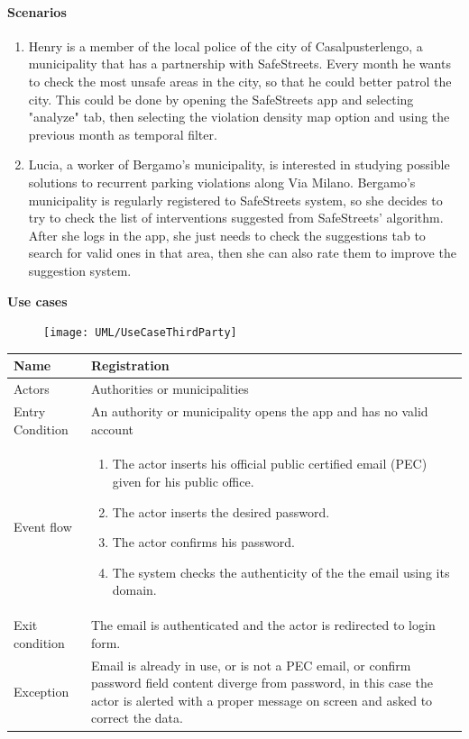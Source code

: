 \paragraph{Scenarios}
\begin{enumerate}
    \item Henry is a member of the local police of the city of Casalpusterlengo, a municipality that has a partnership with SafeStreets. Every month he wants to check the most unsafe areas in the city, so that he could better patrol the city. This could be done by opening the SafeStreets app and selecting "analyze" tab, then selecting the violation density map option and using the previous month as temporal filter.
    
    \item Lucia, a worker of Bergamo's municipality, is interested in studying possible solutions to recurrent parking violations along Via Milano. Bergamo's municipality is regularly registered to SafeStreets system, so she decides to try to check the list of interventions suggested from SafeStreets' algorithm. After she logs in the app, she just needs to check the suggestions tab to search for valid ones in that area, then she can also rate them to improve the suggestion system.
\end{enumerate}
\textbf{Use cases}
\begin{figure}[H]
        \centering
        \texttt{[image: UML/UseCaseThirdParty]}
\end{figure}

\vskip 0.2in
\begin{tabular}{|p{3.1cm}|p{11.6cm}|}
\hline
Name & Registration\\
\hline
Actors & Authorities or municipalities\\
\hline
Entry Condition & An authority or municipality opens the app and has no valid account\\
\hline
Event flow & \begin{enumerate}
                \item The actor inserts his official public certified email (PEC) given for his public office.
                \item The actor inserts the desired password.
                \item The actor confirms his password.
                \item The system checks the authenticity of the the email using its domain.
            \end{enumerate}\\
\hline
Exit condition & The email is authenticated and the actor is redirected to login form.\\
\hline
Exception & Email is already in use, or is not a PEC email, or confirm password field content diverge from password, in this case the actor is alerted with a proper message on screen and asked to correct the data.\\
\hline
\end{tabular}

